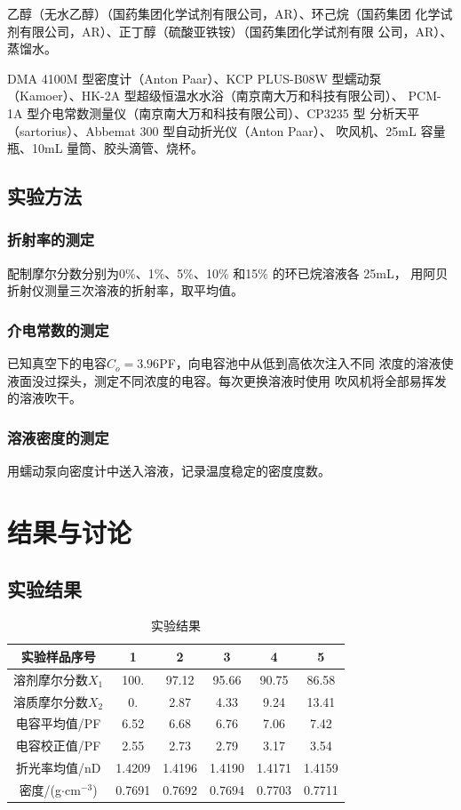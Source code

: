\documentclass[12pt]{ctexart}
\numberwithin{equation}{section}
\begin{document}
乙醇（无水乙醇）（国药集团化学试剂有限公司，AR）、环己烷（国药集团
化学试剂有限公司，AR）、正丁醇（硫酸亚铁铵）（国药集团化学试剂有限
公司，AR）、蒸馏水。

DMA 4100M 型密度计（Anton Paar）、KCP PLUS-B08W 型蠕动泵
（Kamoer）、HK-2A 型超级恒温水水浴（南京南大万和科技有限公司）、
PCM-1A 型介电常数测量仪（南京南大万和科技有限公司）、CP3235 型
分析天平（sartorius）、Abbemat 300 型自动折光仪（Anton Paar）、
吹风机、25mL 容量瓶、10mL 量筒、胶头滴管、烧杯。

\subsection{实验方法}
\subsubsection{折射率的测定}

配制摩尔分数分别为0\%、1\%、5\%、10\% 和15\% 的环已烷溶液各 25mL，
用阿贝折射仪测量三次溶液的折射率，取平均值。

\subsubsection{介电常数的测定}

已知真空下的电容$C_o = 3.96$PF，向电容池中从低到高依次注入不同
浓度的溶液使液面没过探头，测定不同浓度的电容。每次更换溶液时使用
吹风机将全部易挥发的溶液吹干。

\subsubsection{溶液密度的测定}

用蠕动泵向密度计中送入溶液，记录温度稳定的密度度数。

\section{结果与讨论}
\subsection{实验结果}

\begin{longtable}{c|ccccc}
    \caption{实验结果} \\
    \hline
    实验样品序号 & 1 & 2 & 3 & 4 & 5 \\
    \hline
    溶剂摩尔分数$X_1$ & 100. &  97.12 &  95.66 &  90.75 &  86.58  \\
    \hline
    溶质摩尔分数$X_2$ & 0. &  2.87 &  4.33 &  9.24 &  13.41  \\
    \hline
    电容平均值/PF & 6.52 & 6.68 & 6.76 & 7.06 & 7.42 \\
    \hline
    电容校正值/PF & 2.55 & 2.73 & 2.79 & 3.17 & 3.54 \\
    \hline
    折光率均值/nD & 1.4209 & 1.4196 & 1.4190 & 1.4171 & 1.4159 \\
    \hline
    密度/(g$\cdot$cm$^{-3}$) & 0.7691 & 0.7692 & 0.7694 & 0.7703 & 0.7711 \\
    \hline
\end{longtable}
\end{document}
